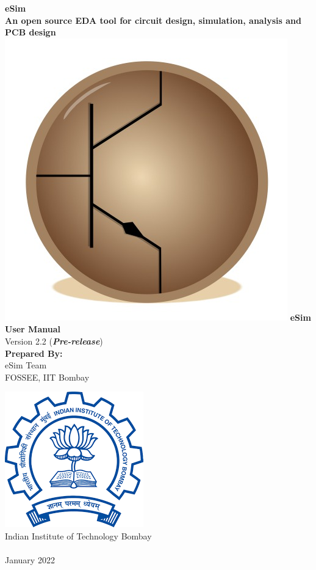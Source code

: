 \begin{center}
{\bf {\Huge eSim} \\ [0.1in]
\LARGE An open source EDA tool for circuit design,
  simulation, analysis and PCB design} \\
\vfill
\includegraphics[width=0.3\linewidth]{logo-trimmed.png}
\vfill
\LARGE \textbf{eSim User Manual} \\ 
\small{Version 2.2 (\textbf{\textit{Pre-release}})}\\
\vspace{1cm}
\textbf{Prepared By:}\\
eSim Team\\
FOSSEE, IIT Bombay

\vspace{1cm}
\includegraphics[width=0.2\linewidth]{iitblogo.png} \\
Indian Institute of Technology Bombay \\ [2mm]
{\LARGE \byncnd} \\ [1mm]
January 2022
\end{center}



\cleardoublepage
